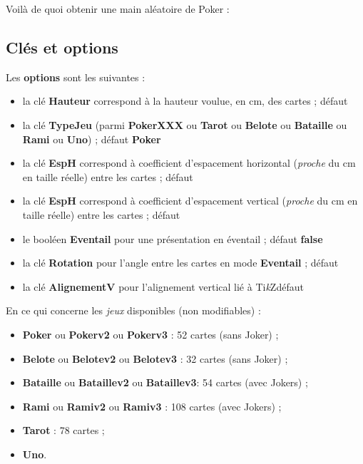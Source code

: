 \documentclass{article}
\providecommand\tikzlogo{Ti\textit{k}Z}
\let\TikZ\tikzlogo
\newcommand\Cle[1]{{\bfseries\sffamily\textlangle #1\textrangle}}
\begin{document}
{{{{{{{\begin{codetex}
\end{codetex}

\begin{codetex}[]
Voilà de quoi obtenir une main aléatoire de Poker :

\end{codetex}

\subsection{Clés et options}

\begin{codecles}
Les \Cle{options} sont les suivantes :

\begin{itemize}
	\item la clé \Cle{Hauteur} correspond à la hauteur voulue, en cm, des cartes ; \hfill{}défaut \Cle{4.25}
	\item la clé \Cle{TypeJeu} (parmi \Cle{PokerXXX} ou \Cle{Tarot} ou \Cle{Belote} ou \Cle{Bataille} ou \Cle{Rami} ou \Cle{Uno}) ; \hfill{}défaut \Cle{Poker}
	\item la clé \Cle{EspH} correspond à coefficient d'espacement horizontal (\textit{proche} du cm en taille réelle) entre les cartes ; \hfill{}défaut \Cle{1}
	\item la clé \Cle{EspH} correspond à coefficient d'espacement vertical (\textit{proche} du cm en taille réelle) entre les cartes ; \hfill{}défaut \Cle{0}
	\item le booléen \Cle{Eventail} pour une présentation en éventail ; \hfill{}défaut \Cle{false}
	\item la clé \Cle{Rotation} pour l'angle entre les cartes en mode \Cle{Eventail}  ; \hfill{}défaut \Cle{10}
	\item la clé \Cle{AlignementV} pour l'alignement vertical lié à \TikZ{}\hfill{}défaut \Cle{0.5}
\end{itemize}
\end{codecles}

\begin{codeinfo}
En ce qui concerne les \textit{jeux} disponibles (non modifiables) :

\begin{itemize}
	\item \Cle{Poker} ou \Cle{Pokerv2} ou \Cle{Pokerv3} : 52 cartes (sans Joker) ;
	\item \Cle{Belote} ou \Cle{Belotev2} ou \Cle{Belotev3} : 32 cartes (sans Joker) ;
	\item \Cle{Bataille} ou \Cle{Bataillev2} ou \Cle{Bataillev3}: 54 cartes (avec Jokers) ;
	\item \Cle{Rami} ou \Cle{Ramiv2} ou \Cle{Ramiv3} : 108 cartes (avec Jokers) ;
	\item \Cle{Tarot} : 78 cartes ;
	\item \Cle{Uno}.
\end{itemize}
\end{codeinfo}

}}}}}}}
\end{document}
